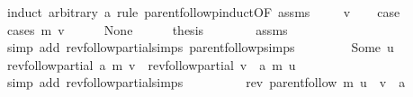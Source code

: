 \begin{isabellebody}
%
\isadelimproof
%
\endisadelimproof
%
\isatagproof
{}\isamarkupfalse%
\ {\isacharparenleft}{\kern0pt}induct\ arbitrary{\isacharcolon}{\kern0pt}\ a\ rule{\isacharcolon}{\kern0pt}\ parent{\isachardot}{\kern0pt}follow{\isacharunderscore}{\kern0pt}pinduct{\isacharbrackleft}{\kern0pt}OF\ assms{\isacharbrackright}{\kern0pt}{\isacharparenright}{\kern0pt}\isanewline
\ \ \isamarkupfalse%
\ {\isacharparenleft}{\kern0pt}{}\ v{\isacharparenright}{\kern0pt}\isanewline
\ \ \isamarkupfalse%
\ {\isacharquery}{\kern0pt}case\isanewline
\ \ \isamarkupfalse%
\ {\isacharparenleft}{\kern0pt}cases\ {\isachardoublequoteopen}m\ v{\isachardoublequoteclose}{\isacharparenright}{\kern0pt}\isanewline
\ \ \ \ \isamarkupfalse%
\ None\isanewline
\ \ \ \ \isamarkupfalse%
\ {\isacharquery}{\kern0pt}thesis\isanewline
\ \ \ \ \ \ \isamarkupfalse%
\ assms\isanewline
\ \ \ \ \ \ \isamarkupfalse%
\ {\isacharparenleft}{\kern0pt}simp\ add{\isacharcolon}{\kern0pt}\ rev{\isacharunderscore}{\kern0pt}follow{\isacharunderscore}{\kern0pt}partial{\isachardot}{\kern0pt}simps\ parent{\isachardot}{\kern0pt}follow{\isacharunderscore}{\kern0pt}psimps{\isacharparenright}{\kern0pt}\isanewline
\ \ \isamarkupfalse%
\isanewline
\ \ \ \ \isamarkupfalse%
\ {\isacharparenleft}{\kern0pt}Some\ u{\isacharparenright}{\kern0pt}\isanewline
\ \ \ \ \isamarkupfalse%
\ {\isachardoublequoteopen}rev{\isacharunderscore}{\kern0pt}follow{\isacharunderscore}{\kern0pt}partial\ a\ m\ v\ {\isacharequal}{\kern0pt}\ rev{\isacharunderscore}{\kern0pt}follow{\isacharunderscore}{\kern0pt}partial\ {\isacharparenleft}{\kern0pt}v\ {\isacharhash}{\kern0pt}\ a{\isacharparenright}{\kern0pt}\ m\ u{\isachardoublequoteclose}\isanewline
\ \ \ \ \ \ \isamarkupfalse%
\ {\isacharparenleft}{\kern0pt}simp\ add{\isacharcolon}{\kern0pt}\ rev{\isacharunderscore}{\kern0pt}follow{\isacharunderscore}{\kern0pt}partial{\isachardot}{\kern0pt}simps{\isacharparenright}{\kern0pt}\isanewline
\ \ \ \ \isamarkupfalse%
\ \isamarkupfalse%
\ {\isachardoublequoteopen}{\isachardot}{\kern0pt}{\isachardot}{\kern0pt}{\isachardot}{\kern0pt}\ {\isacharequal}{\kern0pt}\ rev\ {\isacharparenleft}{\kern0pt}parent{\isachardot}{\kern0pt}follow\ m\ u{\isacharparenright}{\kern0pt}\ {\isacharat}{\kern0pt}\ {\isacharparenleft}{\kern0pt}v\ {\isacharhash}{\kern0pt}\ a{\isacharparenright}{\kern0pt}{\isachardoublequoteclose}\isanewline
\ \ \ \ \ \ \isamarkupfalse%

\end{isabellebody}
